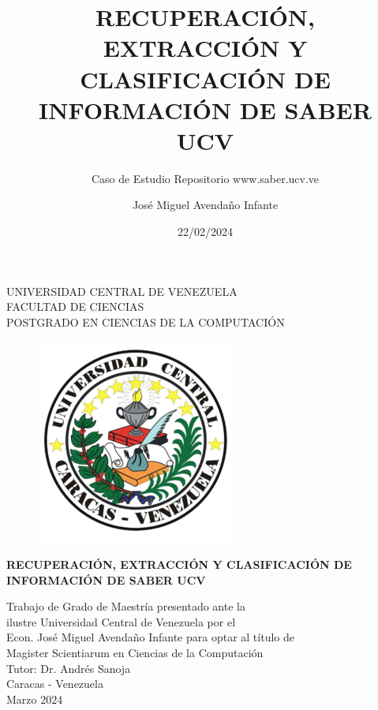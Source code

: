 \documentclass[
  12pt,
  openany]{book}
\title{RECUPERACIÓN, EXTRACCIÓN Y CLASIFICACIÓN DE INFORMACIÓN DE SABER UCV}
\subtitle{Caso de Estudio Repositorio www.saber.ucv.ve}
\author{José Miguel Avendaño Infante}
\date{22/02/2024}
\begin{document}
\maketitle

\thispagestyle{empty}
\begin{center}
	UNIVERSIDAD CENTRAL DE VENEZUELA\\
	FACULTAD DE CIENCIAS\\
	POSTGRADO EN CIENCIAS DE LA COMPUTACI\'ON\\

	\begin{figure}
						\centering
						  \includegraphics[height=.7\textwidth]{images/UCV.png}
  \end{figure}
  \vspace{1.5cm}
  \large{\textbf{RECUPERACI\'ON, EXTRACCI\'ON Y CLASIFICACI\'ON DE \\ INFORMACI\'ON DE SABER UCV}}

  \vspace{3cm}
  Trabajo de Grado de Maestría presentado ante la \\
  ilustre Universidad Central de Venezuela por el\\
  Econ. José Miguel Avendaño Infante para  optar
  al título de \\Magister Scientiarum en Ciencias de la Computaci\'on\\
  \vspace{0.5cm}
  Tutor: Dr. Andrés Sanoja\\
  \vspace{1.5cm}
  Caracas - Venezuela\\
  Marzo 2024
\end{center}
\end{document}
